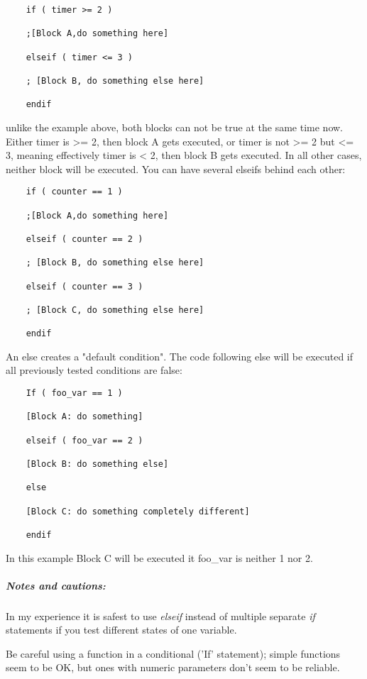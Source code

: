\begin{lstlisting}
	if ( timer >= 2 )
	
	;[Block A,do something here]
	
	elseif ( timer <= 3 )
	
	; [Block B, do something else here]
	
	endif
\end{lstlisting}

unlike the example above, both blocks can not be true at the same time
now. Either timer is >= 2, then block A gets executed, or
timer is not >= 2 but <= 3, meaning effectively timer
is < 2, then block B gets executed. In all other cases,
neither block will be executed. You can have several elseifs behind each
other:

\begin{lstlisting}
	if ( counter == 1 )
	
	;[Block A,do something here]
	
	elseif ( counter == 2 )
	
	; [Block B, do something else here]
	
	elseif ( counter == 3 )
	
	; [Block C, do something else here]
	
	endif
\end{lstlisting}

An else creates a "default condition". The code following else will be
executed if all previously tested conditions are false:

\begin{lstlisting}
	If ( foo_var == 1 )
	
	[Block A: do something]
	
	elseif ( foo_var == 2 )
	
	[Block B: do something else]
	
	else
	
	[Block C: do something completely different]
	
	endif
\end{lstlisting}

In this example Block C will be executed it foo\_var is neither 1 nor 2.

\hypertarget{notes-and-cautions}{%
\subparagraph{Notes and cautions:}\label{notes-and-cautions}}

In my experience it is safest to use \emph{elseif} instead of multiple
separate \emph{if} statements if you test different states of one
variable.

Be careful using a function in a conditional ('If' statement); simple
functions seem to be OK, but ones with numeric parameters don't seem to
be reliable.

